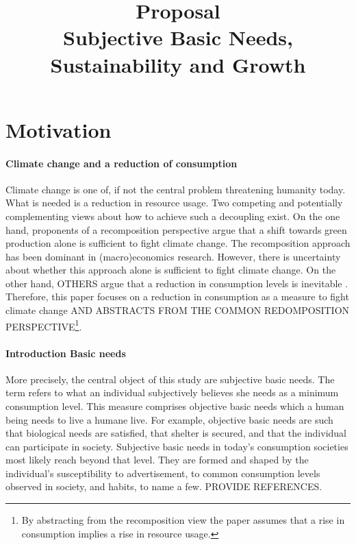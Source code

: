 \documentclass[12pt]{article}
\title{Proposal \\ Subjective Basic Needs, Sustainability and Growth}
\date{}
\begin{document}
	\maketitle
	\tableofcontents
\section{Motivation}

\paragraph{Climate change and a reduction of consumption}
Climate change is one of, if not the central problem threatening humanity today. 
What is needed is a reduction in resource usage. Two competing and potentially complementing views about how to achieve such a decoupling exist. 
On the one hand, proponents of a recomposition perspective argue that a shift towards green production alone is sufficient to fight climate change. 
The recomposition approach has been dominant in (macro)economics research. However, there is uncertainty about whether this approach alone is sufficient to fight climate change.
 On the other hand, OTHERS argue  that a reduction in consumption levels is inevitable \citep[compare][]{Gough2015ClimateNeeds}.
Therefore,  this paper focuses on a reduction in consumption as a measure to fight climate change  AND ABSTRACTS FROM THE COMMON REDOMPOSITION PERSPECTIVE\footnote{By abstracting from the recomposition view the paper assumes that a rise in consumption implies a rise in resource usage. }.

\paragraph{Introduction Basic needs}
 More precisely, the central object of this study are subjective basic needs. The term refers to what an individual subjectively believes she needs as a minimum consumption level. This measure comprises objective basic needs which a human being needs to live a humane live. 
 For example, objective basic needs are such that biological needs are satisfied, that shelter is secured, and that the individual can participate in society. 
Subjective basic needs in today's consumption societies most likely reach beyond that level. They are formed and shaped by the individual's susceptibility to advertisement, to common consumption levels observed in society, and habits, to name a few. PROVIDE REFERENCES. 
\end{document}
